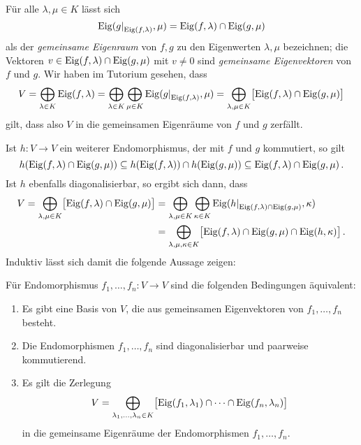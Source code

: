 \section{}

Für alle $\lambda, \mu \in K$ lässt sich
\[
    \eigenspace{ \restrict{g}{\eigenspace{f}{\lambda}} }{\mu}
  = \eigenspace{f}{\lambda} \cap \eigenspace{g}{\mu}
\]
als der \emph{gemeinsame Eigenraum} von $f, g$ zu den Eigenwerten $\lambda, \mu$ bezeichnen;
die Vektoren $v \in \operatorname{Eig}(f, \lambda) \cap \operatorname{Eig}(g, \mu)$ mit $v \neq 0$ sind \emph{gemeinsame Eigenvektoren} von $f$ und $g$.
Wir haben im Tutorium gesehen, dass
\[
    V
  = \bigoplus_{\lambda \in K} \eigenspace{f}{\lambda}
  = \bigoplus_{\lambda \in K} \bigoplus_{\mu \in K} \eigenspace{ \restrict{g}{\eigenspace{f}{\lambda}} }{\mu}
  = \bigoplus_{\lambda, \mu \in K} \bigl[ \eigenspace{f}{\lambda} \cap \eigenspace{g}{\mu} \bigr]
\]
gilt, dass also $V$ in die gemeinsamen Eigenräume von $f$ und $g$ zerfällt.

Ist $h \colon V \to V$ ein weiterer Endomorphismus, der mit $f$ und $g$ kommutiert, so gilt
\[
            h( \operatorname{Eig}(f, \lambda) \cap \operatorname{Eig}(g, \mu)  )
  \subseteq h(\operatorname{Eig}(f, \lambda)) \cap h(\operatorname{Eig}(g, \mu))
  \subseteq \operatorname{Eig}(f, \lambda) \cap \operatorname{Eig}(g, \mu) \,.
\]
Ist $h$ ebenfalls diagonalisierbar, so ergibt sich dann, dass
\begin{align*}
      V
   =  \bigoplus_{\lambda, \mu \in K} \bigl[ \eigenspace{f}{\lambda} \cap \eigenspace{g}{\mu} \bigr]
  &=  \bigoplus_{\lambda, \mu \in K}
      \bigoplus_{\kappa \in K}
      \eigenspace{ \restrict{h}{ \eigenspace{f}{\lambda} \cap \eigenspace{g}{\mu} } }{\kappa} \\
  &=  \bigoplus_{\lambda, \mu, \kappa \in K}
      \bigl[ \eigenspace{f}{\lambda} \cap \eigenspace{g}{\mu} \cap \eigenspace{h}{\kappa} \bigr] \,.
\end{align*}
Induktiv lässt sich damit die folgende Aussage zeigen:

\begin{proposition}
  \label{proposition: equivalent conditions for simultaneously diagonalizable}
  Für Endomorphismus $f_1, \dotsc, f_n \colon V \to V$ sind die folgenden Bedingungen äquivalent:
  \begin{enumerate}
    \item
      Es gibt eine Basis von $V$, die aus gemeinsamen Eigenvektoren von $f_1, \dotsc, f_n$ besteht.
    \item
      Die Endomorphismen $f_1, \dotsc, f_n$ sind diagonalisierbar und paarweise kommutierend.
    \item
      Es gilt die Zerlegung
      \[
          V
        = \bigoplus_{\lambda_1, \dotsc, \lambda_n \in K}
          \bigl[ \operatorname{Eig}(f_1, \lambda_1) \cap \dotsb \cap \operatorname{Eig}(f_n, \lambda_n) \bigr]
      \]
      in die gemeinsame Eigenräume der Endomorphismen $f_1, \dotsc, f_n$.
  \end{enumerate}
\end{proposition}

